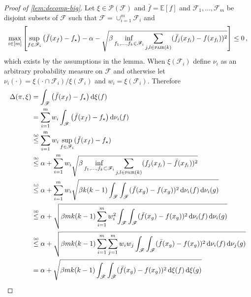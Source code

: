 \documentclass[letter, 12pt]{report}
\newcommand{\pair}{\operatorname{\textsc{pair}}}
\newcommand{\explan}[1]{\stackrel{\text{\tiny \texttt{#1}}}}
\newcommand{\E}{\mathbb E}
\newcommand{\sF}{\mathscr F}
\newcommand{\sP}{\mathscr P}
\renewcommand{\d}[1]{\operatorname{d}\!#1}
\newcommand{\1}{\mathbf{1}}
\theoremstyle{plain}
\theoremstyle{definition}
\theoremstyle{remark}
\begin{document}
\begin{proof}[Proof of \cref{lem:decomp-big}]
    Let $\xi \in \sP(\sF)$ and $\bar f = \E[f]$ and
    $\sF_1,\ldots,\sF_m$ be disjoint subsets of $\sF$ such that $\sF = \cup_{i=1}^m \sF_i$ and
    \begin{align}
        \max_{i \in [m]} \left[\sup_{f \in \sF_i} \left(\bar f(x_f) - f_\star\right) - \alpha - \sqrt{\beta \inf_{f_1,\ldots,f_k \in \sF_i} \sum_{j, l \in \pair(k)} (\bar f_j(x_{f_l}) - f(x_{f_l}))^2}\right] \leq 0 \,,
        \label{eq:decomp:1}
    \end{align}
    which exists by the assumptions in the lemma.
    When $\xi(\sF_i)$ define $\nu_i$ as an arbitrary probability measure on $\sF$ and otherwise let
    $\nu_i(\cdot) = \xi(\cdot \cap \sF_i) / \xi(\sF_i)$ and $w_i = \xi(\sF_i)$.
    Therefore
    \begin{align}
        \Delta(\pi, \xi)
         & = \int_\sF \left(\bar f(x_f) - f_\star\right) \d{\xi}(f) \nonumber                                                                                               \\
         & = \sum_{i=1}^m w_i \int_\sF \left(\bar f(x_f) - f_\star\right) \d{\nu_i}(f) \nonumber                                                                            \\
         & \explan{(a)}\leq \sum_{i=1}^m w_i \sup_{f \in \sF_i} (\bar f(x_f) - f_\star) \nonumber                                                                           \\
         & \explan{(b)}\leq \alpha + \sum_{i=1}^m w_i \sqrt{\beta \inf_{f_1,\ldots,f_k \subset \sF_i} \sum_{j,l \in \pair(k)} (f_j(x_{f_l}) - \bar f(x_{f_l}))^2} \nonumber \\
         & \explan{(c)}\leq \alpha + \sum_{i=1}^m w_i \sqrt{\beta k(k-1) \int_\sF \int_\sF (\bar f(x_g) - f(x_g))^2 \d{\nu_i}(f) \d{\nu_i}(g)} \nonumber                    \\
         & \explan{(d)}\leq \alpha + \sqrt{\beta m k(k-1) \sum_{i=1}^m w_i^2 \int_\sF \int_\sF (\bar f(x_g) - f(x_g))^2 \d{\nu_i}(f) \d{\nu_i}(g)} \nonumber                \\
         & \explan{(e)}\leq \alpha + \sqrt{\beta m k(k-1) \sum_{i=1}^m \sum_{j=1}^m w_i w_j \int_\sF \int_\sF (\bar f(x_g) - f(x_g))^2 \d{\nu_i}(f) \d{\nu_j}(g)} \nonumber \\
         & = \alpha + \sqrt{\beta m k(k-1) \int_\sF \int_\sF (\bar f(x_g) - f(x_g))^2 \d{\xi}(f) \d{\xi}(g)} \nonumber                                                      \\

\end{align}
\end{proof}
\end{document}

